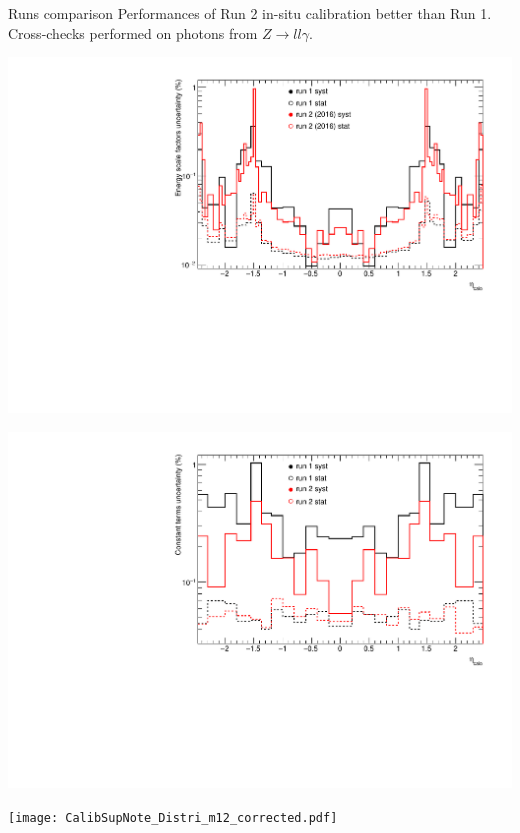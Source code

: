 \begin{frame}{Runs comparison}
  Performances of Run 2 in-situ calibration better than Run 1.
  Cross-checks performed on photons from $Z\rightarrow ll\gamma$.\\
  \begin{minipage}{0.42\linewidth} 
    \includegraphics[width=\linewidth]{Figures/CompareSystRun_alpha.pdf}
  \end{minipage}
  \hfill
  \begin{minipage}{0.42\linewidth}
    \includegraphics[width=\linewidth]{Figures/CompareSystRun_c.pdf}
  \end{minipage}
  \centering
  \begin{minipage}{0.47\linewidth}
    \texttt{[image: CalibSupNote\_Distri\_m12\_corrected.pdf]}
  \end{minipage}

\end{frame}


